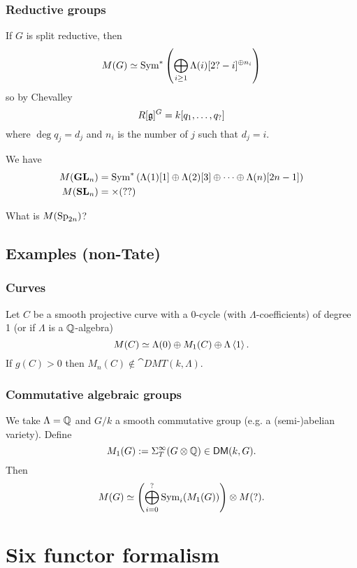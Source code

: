 \subsubsection{Reductive groups}
\begin{theorem}[Biglami]
	 If $G$ is split reductive, then
	 \[
		 M(G) \simeq \operatorname{Sym}^{*}\left( \bigoplus_{i\ge 1}\Lambda(i)[2?-i]^{\oplus n_i} \right) 
	 \] 
	 so by Chevalley
	 \[
		 R[\mathfrak{g}]^{G} = k[q_1,\dots,q_{?}]
	 \] 
	 where $\deg q_j = d_j$ and $n_i$ is the number of $j$ such that $d_j=i$.
\end{theorem}
\begin{example}
	We have
	\begin{align*}
		M(\mathbf{GL}_n) &= \operatorname{Sym}^{*}\left( \Lambda(1)[1] \oplus \Lambda(2)[3]\oplus \dots\oplus \Lambda(n)[2n-1] \right)  \\
		M(\mathbf{SL}_n) &= \times  (??)
	\end{align*}
\end{example}
\begin{exercise}
	What is $M(\operatorname{Sp}_{2n})$?
\end{exercise}
\subsection{Examples (non-Tate)}
\subsubsection{Curves}
\begin{proposition}
	Let $C$ be a smooth projective curve with a 0-cycle (with $\Lambda$-coefficients) of degree 1 (or if $\Lambda$ is a $\mathbb Q$-algebra)
	\[
		M(C) \simeq \Lambda(0) \oplus M_1(C) \oplus \Lambda \left<1 \right>.
	\] 
	If $g(C)>0$ then $M_n(C)\not\in \cat{DMT}(k,\Lambda)$.
\end{proposition}
\subsubsection{Commutative algebraic groups}
\begin{theorem}[?]
	We take $\Lambda=\mathbb Q$ and $G /k$ a smooth commutative group (e.g. a (semi-)abelian variety). Define
	\[
		M_1(G) := \Sigma_T^{\infty}(G\otimes \mathbb Q) \in \mathsf{DM}(k,G).
	\] 
	Then
	\[
	M(G) \simeq \left( \bigoplus_{i=0}^{?}\operatorname{Sym}_i(M_1(G)) \right) \otimes M(?).
	\] 
\end{theorem}

\section{Six functor formalism}

